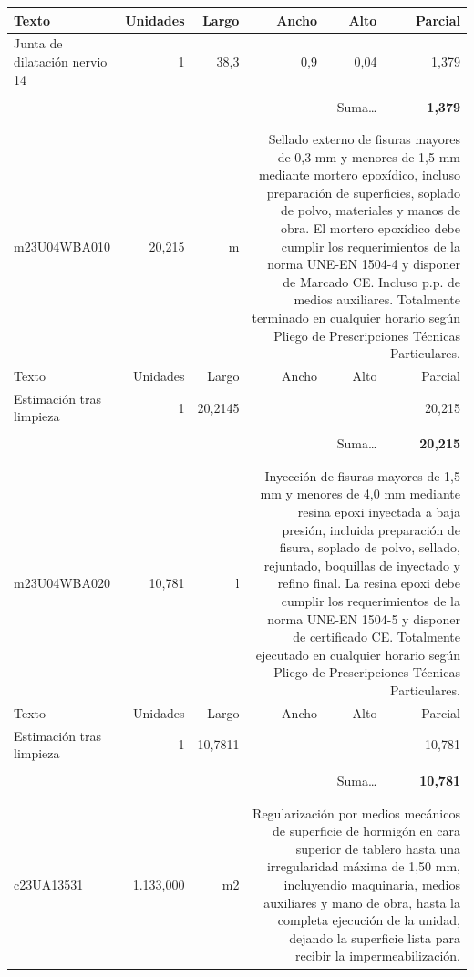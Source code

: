 \documentclass{book}%
\begin{document}
\begin{longtable}{lrrrrr}
Texto&Unidades&Largo&Ancho&Alto&Parcial\\%
\hline%
\multicolumn{1}{p{3.5cm}}{Junta de dilatación nervio 14}&1&38,3&0,9&0,04&     1,379\\%
&&&&&\\%
\multicolumn{5}{r}{Suma\ldots}&\textbf{     1,379}\\%
\hline%
&&&&&\\%
&&&&&\\%
m23U04WBA010&    20,215& m&\multicolumn{3}{p{6cm}}{\scriptsize Sellado externo de fisuras mayores de 0,3 mm y menores de 1,5 mm mediante mortero epoxídico, incluso preparación de superficies, soplado de polvo, materiales y manos de obra. El mortero epoxídico debe cumplir los requerimientos de la norma UNE-EN 1504-4 y disponer de Marcado CE. Incluso p.p. de medios auxiliares. Totalmente terminado en cualquier horario según Pliego de Prescripciones Técnicas Particulares.\normalsize}\\%
Texto&Unidades&Largo&Ancho&Alto&Parcial\\%
\hline%
\multicolumn{1}{p{3.5cm}}{Estimación tras limpieza}&1&20,2145&&&    20,215\\%
&&&&&\\%
\multicolumn{5}{r}{Suma\ldots}&\textbf{    20,215}\\%
\hline%
&&&&&\\%
&&&&&\\%
m23U04WBA020&    10,781& l&\multicolumn{3}{p{6cm}}{\scriptsize Inyección de fisuras mayores de 1,5 mm y menores de 4,0 mm mediante resina epoxi inyectada a baja presión, incluida preparación de fisura, soplado de polvo, sellado, rejuntado, boquillas de inyectado y refino final. La resina epoxi debe cumplir los requerimientos de la norma UNE-EN 1504-5 y disponer de certificado CE. Totalmente ejecutado en cualquier horario según Pliego de Prescripciones Técnicas Particulares.\normalsize}\\%
Texto&Unidades&Largo&Ancho&Alto&Parcial\\%
\hline%
\multicolumn{1}{p{3.5cm}}{Estimación tras limpieza}&1&10,7811&&&    10,781\\%
&&&&&\\%
\multicolumn{5}{r}{Suma\ldots}&\textbf{    10,781}\\%
\hline%
&&&&&\\%
&&&&&\\%
c23UA13531& 1.133,000& m2&\multicolumn{3}{p{6cm}}{\scriptsize Regularización por medios mecánicos de superficie de hormigón en cara superior de tablero hasta una irregularidad máxima de 1,50 mm, incluyendio maquinaria, medios auxiliares y mano de obra, hasta la completa ejecución de la unidad, dejando la superficie lista para recibir la impermeabilización.\normalsize}\\%

\end{longtable}
\end{document}
